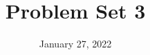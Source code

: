 \documentclass[12pt]{article}
\begin{document}
\newcommand{\skipp}{\textrm{skip}}
\newcommand{\boxprod}{\mathop{\square}}
\newcommand{\Set}{\textrm{Set}}
\newcommand{\Cat}{\textrm{Cat}}
\newcommand{\Cayley}{\textrm{Cayley}}
\newcommand{\Preds}{\mathcal{P}}
\newcommand{\triple}[3]{\{#1\}{#2}\{#3\}}
\newcommand{\Triple}{\textrm{Triple}}
\newcommand{\Analyse}{\textrm{Analyse}}
\newcommand{\command}{\textrm{command}}

\newcommand{\id}{\textrm{id}}

\title{Problem Set 3}
\date{January 27, 2022}
\maketitle


\thispagestyle{empty}
\end{document}
